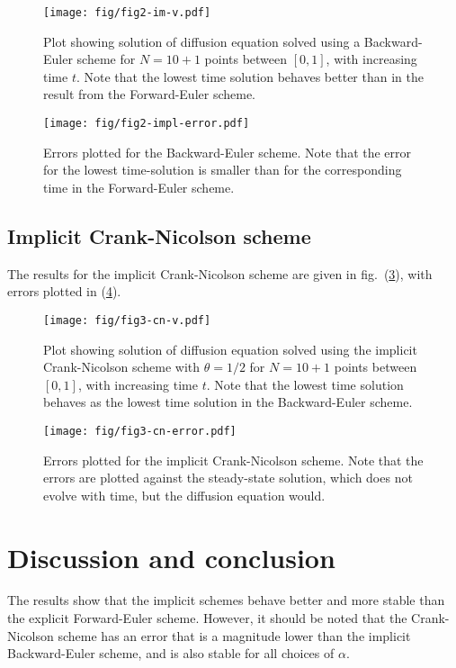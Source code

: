 \documentclass[a4paper,11pt]{article}
\begin{document}
\begin{figure}[htb]
    \centering
    \texttt{[image: fig/fig2-im-v.pdf]}
    \caption{Plot showing solution of diffusion equation solved using a Backward-Euler scheme for $N=10+1$ points between $[0,1]$, with increasing time $t$. Note that the lowest time solution behaves better than in the result from the Forward-Euler scheme.}
    \label{fig:2}
\end{figure}

\begin{figure}[htpb]
    \centering
    \texttt{[image: fig/fig2-impl-error.pdf]}
    \caption{Errors plotted for the Backward-Euler scheme. Note that the error for the lowest time-solution is smaller than for the corresponding time in the Forward-Euler scheme.}
    \label{fig:2e}
\end{figure}

\subsection{Implicit Crank-Nicolson scheme}
The results for the implicit Crank-Nicolson scheme are given in fig.~(\ref{fig:3}), with errors plotted in (\ref{fig:3e}). 

\begin{figure}[htb]
    \centering
    \texttt{[image: fig/fig3-cn-v.pdf]}
    \caption{Plot showing solution of diffusion equation solved using the implicit Crank-Nicolson scheme with $\theta =1/2$ for $N=10+1$ points between $[0,1]$, with increasing time $t$. Note that the lowest time solution behaves as the lowest time solution in the Backward-Euler scheme.}
    \label{fig:3}
\end{figure}

\begin{figure}[htpb]
    \centering
    \texttt{[image: fig/fig3-cn-error.pdf]}
    \caption{Errors plotted for the implicit Crank-Nicolson scheme. Note that the errors are plotted against the steady-state solution, which does not evolve with time, but the diffusion equation would.}
    \label{fig:3e}
\end{figure}

\section{Discussion and conclusion}
The results show that the implicit schemes behave better and more stable than the explicit Forward-Euler scheme. However, it should be noted that the Crank-Nicolson scheme has an error that is a magnitude lower than the implicit Backward-Euler scheme, and is also stable for all choices of $\alpha$. 
\end{document}
